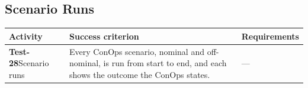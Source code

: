 \documentclass[11pt,a4paper]{article}
\begin{document}
\subsection{Scenario Runs}
{\footnotesize
\begin{xltabular}{\textwidth}{@{}>{\raggedright\arraybackslash}p{3.0cm}>{\raggedright\arraybackslash}X>{\raggedright\arraybackslash}p{2.4cm}@{}}
\toprule
Activity & Success criterion & Requirements \\
\midrule
\endhead
\textbf{Test-28}\newline Scenario runs & Every ConOps scenario, nominal and off-nominal, is run from start to end, and each shows the outcome the ConOps states. & --- \\
\bottomrule
\end{xltabular}}
\addtocounter{table}{-1}
\end{document}
